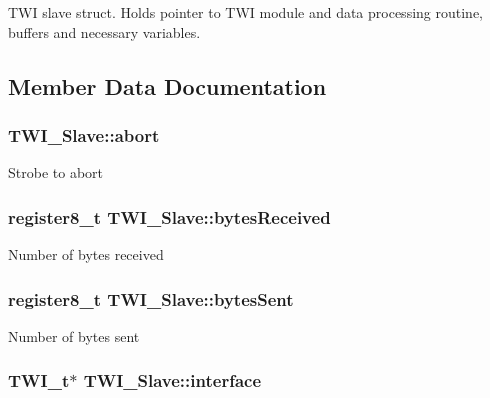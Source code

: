 T\-W\-I slave struct. Holds pointer to T\-W\-I module and data processing routine, buffers and necessary variables. 

\subsection{Member Data Documentation}
\hypertarget{struct_t_w_i___slave_a9f82420e39d70716410a66dcd3c22c1b}{
\subsubsection[{abort}]{ T\-W\-I\-\_\-\-Slave\-::abort}}\label{struct_t_w_i___slave_a9f82420e39d70716410a66dcd3c22c1b}
Strobe to abort \hypertarget{struct_t_w_i___slave_a35d1088ea403c9811886cc3a454d20ff}{
\subsubsection[{bytes\-Received}]{\setlength{\rightskip}{0pt plus 5cm}register8\-\_\-t T\-W\-I\-\_\-\-Slave\-::bytes\-Received}}\label{struct_t_w_i___slave_a35d1088ea403c9811886cc3a454d20ff}
Number of bytes received \hypertarget{struct_t_w_i___slave_ae44adb76a49e3ecca8542d10a1d453f8}{
\subsubsection[{bytes\-Sent}]{\setlength{\rightskip}{0pt plus 5cm}register8\-\_\-t T\-W\-I\-\_\-\-Slave\-::bytes\-Sent}}\label{struct_t_w_i___slave_ae44adb76a49e3ecca8542d10a1d453f8}
Number of bytes sent \hypertarget{struct_t_w_i___slave_a77840b2d29e959498be84cc3bec0cd22}{
\subsubsection[{interface}]{\setlength{\rightskip}{0pt plus 5cm}T\-W\-I\-\_\-t$\ast$ T\-W\-I\-\_\-\-Slave\-::interface}}\label{struct_t_w_i___slave_a77840b2d29e959498be84cc3bec0cd22}
